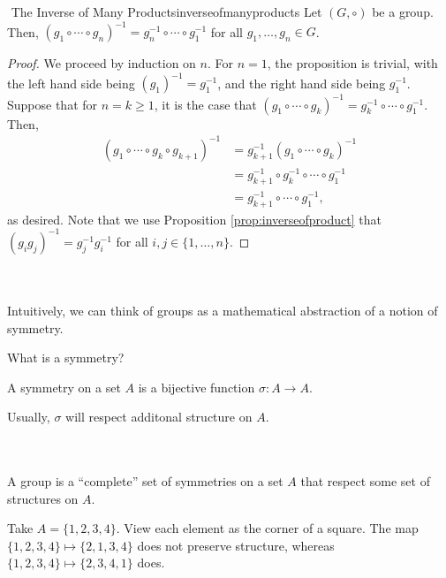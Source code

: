     \begin{proposition}{\Stop\,\,The Inverse of Many Products}{inverseofmanyproducts}
        Let \((G,\circ)\) be a group. Then, \((g_1 \circ\cdots\circ g_n)^{-1}=g_n^{-1}\circ\cdots\circ g_1^{-1}\) for all \(g_1,\ldots,g_n\in G\).
        \begin{proof}
        We proceed by induction on \(n\). For \(n=1\), the proposition is trivial, with the left hand side being \((g_1)^{-1}=g_1^{-1}\), and the right hand side being \(g_1^{-1}\). Suppose that for \(n=k\geq1\), it is the case that \((g_1\circ\cdots\circ g_k)^{-1}=g_k^{-1}\circ\cdots\circ g_1^{-1}\). Then, 
            \begin{align*}
                (g_1\circ\cdots\circ g_k\circ g_{k+1})^{-1}&=g_{k+1}^{-1}(g_1\circ\cdots\circ g_k)^{-1} \\
                &=g_{k+1}^{-1}\circ g_{k}^{-1}\circ\cdots\circ g_1^{-1} \\
                &=g_{k+1}^{-1}\circ\cdots\circ g_1^{-1},
            \end{align*}
            as desired. Note that we use Proposition \ref{prop:inverseofproduct} that \((g_ig_j)^{-1}=g_j^{-1}g_i^{-1}\) for all \(i,j\in\{1,\ldots,n\}\).
        \end{proof}
    \end{proposition}
    \vphantom
    \\
    \\
    Intuitively, we can think of groups as a mathematical abstraction of a notion of symmetry.
    \begin{question*}
        What is a symmetry?
    \end{question*}
    \begin{answer*}
        A symmetry on a set \(A\) is a bijective function \(\sigma:A\to A\).
    \end{answer*}
    \begin{remark*}
        Usually, \(\sigma\) will respect additonal structure on \(A\).
    \end{remark*}
    \vphantom
    \\
    \\
    A group is a ``complete'' set of symmetries on a set \(A\) that respect some set of structures on \(A\).
    \begin{example}
        Take \(A=\{1,2,3,4\}\). View each element as the corner of a square. The map \(\{1,2,3,4\}\mapsto\{2,1,3,4\}\) does not preserve structure, whereas \(\{1,2,3,4\}\mapsto\{2,3,4,1\}\) does.
    \end{example}
